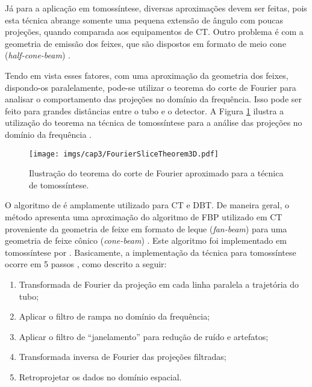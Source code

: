 Já para a aplicação em tomossíntese, diversas aproximações devem ser feitas, pois esta técnica abrange somente uma pequena extensão de ângulo com poucas projeções, quando comparada aos equipamentos de \acs{CT}. Outro problema é com a geometria de emissão dos feixes, que são dispostos em formato de meio cone (\textit{half-cone-beam}) \cite{mertelmeier2014filtered}. 

Tendo em vista esses fatores, com uma aproximação da geometria dos feixes, dispondo-os paralelamente, pode-se utilizar o teorema do corte de Fourier para analisar o comportamento das projeções no domínio da frequência. Isso pode ser feito para grandes distâncias entre o tubo e o detector. A Figura \ref{fig:imgCap3FourierSliceTheorem3D} ilustra a utilização do teorema na técnica de tomossíntese para a análise das projeções no domínio da frequência \cite[p. 101-106]{mertelmeier2014filtered}.

\begin{figure}[H]
	\caption{Ilustração do teorema do corte de Fourier aproximado para a técnica de tomossíntese.}
	\begin{center}
		\texttt{[image: imgs/cap3/FourierSliceTheorem3D.pdf]}
	\end{center}
	\label{fig:imgCap3FourierSliceTheorem3D}
\end{figure} 

O algoritmo de  é amplamente utilizado para \acs{CT} e \acs{DBT}. De maneira geral, o método apresenta uma aproximação do algoritmo de \acs{FBP} utilizado em \acs{CT} proveniente da geometria de feixe em formato de leque (\textit{fan-beam}) para uma geometria de feixe cônico (\textit{cone-beam}) \cite{fessler2014fundamentals}. Este algoritmo foi implementado em tomossíntese por . Basicamente, a implementação da técnica para tomossíntese ocorre em 5 passos \cite[p. 16]{xu2014tomographic}, como descrito a seguir:   

\begin{enumerate}
	\item Transformada de Fourier da projeção em cada linha paralela a trajetória do tubo;
	\item Aplicar o filtro de rampa no domínio da frequência;
	\item Aplicar o filtro de ``janelamento'' para redução de ruído e artefatos;
	\item Transformada inversa de Fourier das projeções filtradas;
	\item Retroprojetar os dados no domínio espacial.   
\end{enumerate} 

